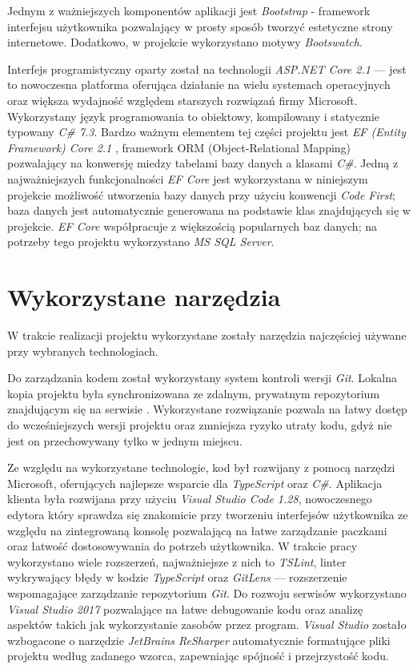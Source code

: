 \documentclass[eng,printmode,openany]{mgr}
\begin{document}
	Jednym z ważniejszych komponentów aplikacji jest \textit{Bootstrap} - framework interfejsu użytkownika pozwalający w prosty sposób tworzyć estetyczne strony internetowe. Dodatkowo, w projekcie wykorzystano motywy \textit{Bootswatch}.
	
	Interfejs programistyczny oparty został na technologii \textit{ASP.NET Core 2.1} — jest to nowoczesna platforma oferująca działanie na wielu systemach operacyjnych oraz większa wydajność względem starszych rozwiązań firmy Microsoft. Wykorzystany język programowania to obiektowy, kompilowany i statycznie typowany \textit{C\# 7.3}. Bardzo ważnym elementem tej części projektu jest \textit{EF (Entity Framework) Core 2.1} \cite{msdn-efcore}, framework ORM (Object-Relational Mapping) pozwalający na konwersję miedzy tabelami bazy danych a klasami \textit{C\#}. Jedną z najważniejszych funkcjonalności \textit{EF Core} jest wykorzystana w niniejszym projekcie możliwość utworzenia bazy danych przy użyciu konwencji \textit{Code First}; baza danych jest automatycznie generowana na podstawie klas  znajdujących się w projekcie. \textit{EF Core} współpracuje z większością popularnych baz danych; na potrzeby tego projektu wykorzystano \textit{MS SQL Server}.
	
	\section{Wykorzystane narzędzia}
	W trakcie realizacji projektu wykorzystane zostały narzędzia najczęściej używane przy wybranych technologiach.
	
	Do zarządzania kodem został wykorzystany system kontroli wersji \textit{Git}. Lokalna kopia projektu była synchronizowana ze zdalnym, prywatnym repozytorium znajdującym się na serwisie . Wykorzystane rozwiązanie pozwala na łatwy dostęp do wcześniejszych wersji projektu oraz zmniejsza ryzyko utraty kodu, gdyż nie jest on przechowywany tylko w jednym miejscu.
	
	Ze względu na wykorzystane technologie, kod był rozwijany z pomocą narzędzi Microsoft, oferujących najlepsze wsparcie dla \textit{TypeScript} oraz \textit{C\#}. Aplikacja klienta była rozwijana przy użyciu \textit{Visual Studio Code 1.28}, nowoczesnego edytora który sprawdza się znakomicie przy tworzeniu interfejsów użytkownika ze względu na zintegrowaną konsolę pozwalającą na łatwe zarządzanie paczkami oraz łatwość dostosowywania do potrzeb użytkownika. W trakcie pracy wykorzystano wiele rozszerzeń, najważniejsze z nich to \textit{TSLint}, linter wykrywający błędy w kodzie \textit{TypeScript} oraz \textit{GitLens} — rozszerzenie wspomagające zarządzanie repozytorium \textit{Git}. Do rozwoju serwisów wykorzystano \textit{Visual Studio 2017} pozwalające na łatwe debugowanie kodu oraz analizę aspektów takich jak wykorzystanie zasobów przez program. \textit{Visual Studio} zostało wzbogacone o narzędzie \textit{JetBrains ReSharper} automatycznie formatujące pliki projektu według zadanego wzorca, zapewniając spójność i przejrzystość kodu.
	
\end{document}
